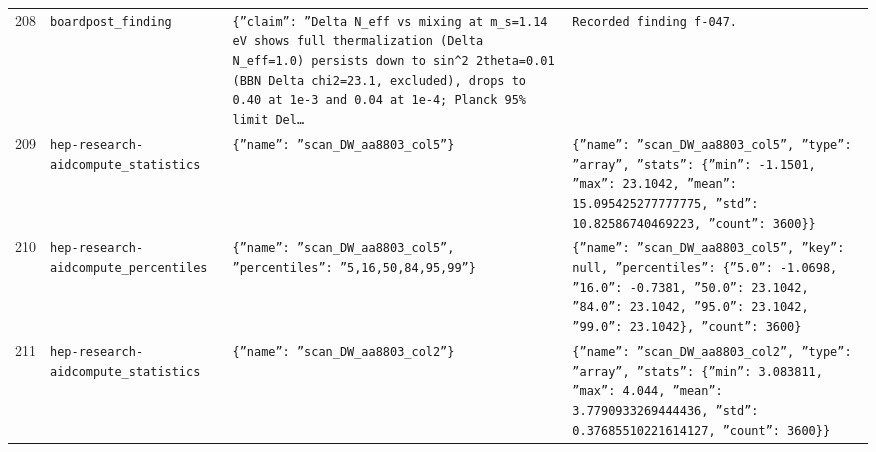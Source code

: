 \documentclass[11pt,a4paper]{article}
\begin{document}
\begin{longtable}{@{}p{}p{}p{}p{}@{}}
208 & \texttt{board}\newline\texttt{post\_\allowbreak{}finding} & \texttt{\{''claim'':\allowbreak{} ''Delta N\_\allowbreak{}eff vs mixing at m\_\allowbreak{}s=\allowbreak{}1.14 eV shows full thermalization (Delta N\_\allowbreak{}eff=\allowbreak{}1.0)\allowbreak{} persists down to sin\textasciicircum{}\allowbreak{}2 2theta=\allowbreak{}0.01 (BBN Delta chi2=\allowbreak{}23.1,\allowbreak{} excluded)\allowbreak{},\allowbreak{} drops to 0.40 at 1e-3 and 0.04 at 1e-4;\allowbreak{} Planck 95\% limit Del\ldots{}\allowbreak{}} & \texttt{Recorded finding f-047.} \\
209 & \texttt{hep-research-aid}\newline\texttt{compute\_\allowbreak{}statistics} & \texttt{\{''name'':\allowbreak{} ''scan\_\allowbreak{}DW\_\allowbreak{}aa8803\_\allowbreak{}col5''\}\allowbreak{}} & \texttt{\{''name'':\allowbreak{} ''scan\_\allowbreak{}DW\_\allowbreak{}aa8803\_\allowbreak{}col5'',\allowbreak{} ''type'':\allowbreak{} ''array'',\allowbreak{} ''stats'':\allowbreak{} \{''min'':\allowbreak{} -1.1501,\allowbreak{} ''max'':\allowbreak{} 23.1042,\allowbreak{} ''mean'':\allowbreak{} 15.095425277777775,\allowbreak{} ''std'':\allowbreak{} 10.82586740469223,\allowbreak{} ''count'':\allowbreak{} 3600\}\allowbreak{}\}\allowbreak{}} \\
210 & \texttt{hep-research-aid}\newline\texttt{compute\_\allowbreak{}percentiles} & \texttt{\{''name'':\allowbreak{} ''scan\_\allowbreak{}DW\_\allowbreak{}aa8803\_\allowbreak{}col5'',\allowbreak{} ''percentiles'':\allowbreak{} ''5,\allowbreak{}16,\allowbreak{}50,\allowbreak{}84,\allowbreak{}95,\allowbreak{}99''\}\allowbreak{}} & \texttt{\{''name'':\allowbreak{} ''scan\_\allowbreak{}DW\_\allowbreak{}aa8803\_\allowbreak{}col5'',\allowbreak{} ''key'':\allowbreak{} null,\allowbreak{} ''percentiles'':\allowbreak{} \{''5.0'':\allowbreak{} -1.0698,\allowbreak{} ''16.0'':\allowbreak{} -0.7381,\allowbreak{} ''50.0'':\allowbreak{} 23.1042,\allowbreak{} ''84.0'':\allowbreak{} 23.1042,\allowbreak{} ''95.0'':\allowbreak{} 23.1042,\allowbreak{} ''99.0'':\allowbreak{} 23.1042\}\allowbreak{},\allowbreak{} ''count'':\allowbreak{} 3600\}\allowbreak{}} \\
211 & \texttt{hep-research-aid}\newline\texttt{compute\_\allowbreak{}statistics} & \texttt{\{''name'':\allowbreak{} ''scan\_\allowbreak{}DW\_\allowbreak{}aa8803\_\allowbreak{}col2''\}\allowbreak{}} & \texttt{\{''name'':\allowbreak{} ''scan\_\allowbreak{}DW\_\allowbreak{}aa8803\_\allowbreak{}col2'',\allowbreak{} ''type'':\allowbreak{} ''array'',\allowbreak{} ''stats'':\allowbreak{} \{''min'':\allowbreak{} 3.083811,\allowbreak{} ''max'':\allowbreak{} 4.044,\allowbreak{} ''mean'':\allowbreak{} 3.7790933269444436,\allowbreak{} ''std'':\allowbreak{} 0.37685510221614127,\allowbreak{} ''count'':\allowbreak{} 3600\}\allowbreak{}\}\allowbreak{}} \\

\end{longtable}
\end{document}
